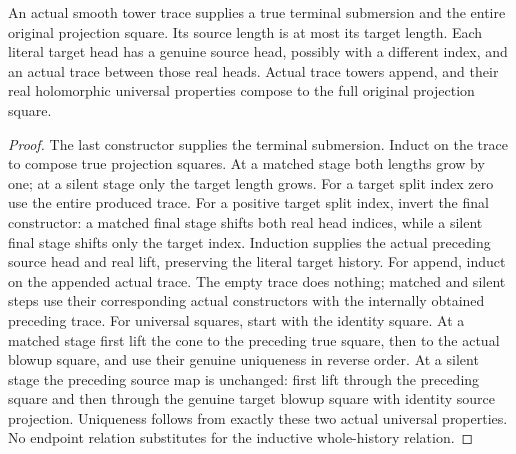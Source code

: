 \begin{theorem}
\label{hir:submersion-compressed-image-trace-all-head-algebra}
\leanok
{}

An actual smooth tower trace supplies a true terminal submersion and the entire original projection square. Its source length is at most its target length. Each literal target head has a genuine source head, possibly with a different index, and an actual trace between those real heads. Actual trace towers append, and their real holomorphic universal properties compose to the full original projection square.
\end{theorem}
\begin{proof}
The last constructor supplies the terminal submersion. Induct on the trace to compose true projection squares. At a matched stage both lengths grow by one; at a silent stage only the target length grows. For a target split index zero use the entire produced trace. For a positive target split index, invert the final constructor: a matched final stage shifts both real head indices, while a silent final stage shifts only the target index. Induction supplies the actual preceding source head and real lift, preserving the literal target history. For append, induct on the appended actual trace. The empty trace does nothing; matched and silent steps use their corresponding actual constructors with the internally obtained preceding trace. For universal squares, start with the identity square. At a matched stage first lift the cone to the preceding true square, then to the actual blowup square, and use their genuine uniqueness in reverse order. At a silent stage the preceding source map is unchanged: first lift through the preceding square and then through the genuine target blowup square with identity source projection. Uniqueness follows from exactly these two actual universal properties. No endpoint relation substitutes for the inductive whole-history relation.
\end{proof}

